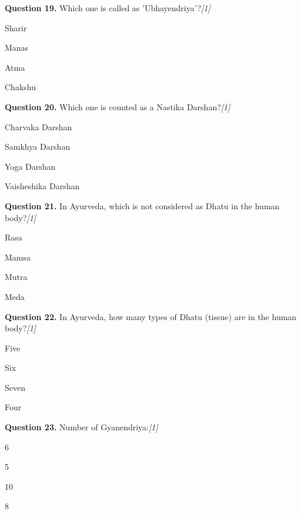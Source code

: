 \documentclass[11pt,a4paper]{article}
\newcommand{\pts}[1]{\hfill   \textit{[#1]}}
\begin{document}
\medskip


\noindent   \textbf{Question 19.} Which one is called as 'Ubhayendriya'?\pts{1}

\begin{parts}
  \item Sharir
  \item Manas
  \item Atma
  \item Chakshu
\end{parts}

\medskip


\noindent   \textbf{Question 20.} Which one is counted as a Nastika Darshan?\pts{1}

\begin{parts}
  \item Charvaka Darshan
  \item Samkhya Darshan
  \item Yoga Darshan
  \item Vaisheshika Darshan
\end{parts}

\medskip


\noindent   \textbf{Question 21.} In Ayurveda, which is not considered as Dhatu in the human body?\pts{1}

\begin{parts}
  \item Rasa
  \item Mamsa
  \item Mutra
  \item Meda
\end{parts}

\medskip


\noindent   \textbf{Question 22.} In Ayurveda, how many types of Dhatu (tissue) are in the human body?\pts{1}

\begin{parts}
  \item Five
  \item Six
  \item Seven
  \item Four
\end{parts}

\medskip


\noindent   \textbf{Question 23.} Number of Gyanendriya:\pts{1}

\begin{parts}
  \item 6
  \item 5
  \item 10
  \item 8
\end{parts}
\end{document}
